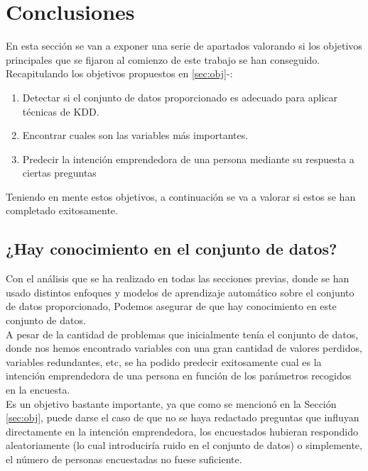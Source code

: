\chapter{Conclusiones}
\label{sec:conclusiones}
En esta sección se van a exponer una serie de apartados valorando si los objetivos principales que se fijaron al comienzo de este trabajo se han conseguido.\\
\linebreak
Recapitulando los objetivos propuestos en \ref{sec:obj}-:
\begin{enumerate}[1.]
	\item Detectar si el conjunto de datos proporcionado es adecuado para aplicar técnicas de KDD.
	\item Encontrar cuales son las variables más importantes.
	\item Predecir la intención emprendedora de una persona mediante su respuesta a ciertas preguntas
\end{enumerate}
Teniendo en mente estos objetivos, a continuación se va a valorar si estos se han completado exitosamente.
\section{¿Hay conocimiento en el conjunto de datos?}
Con el análisis que se ha realizado en todas las secciones previas, donde se han usado distintos enfoques y modelos de aprendizaje automático sobre el conjunto de datos proporcionado, Podemos asegurar de que hay conocimiento en este conjunto de datos.\\
\linebreak
A pesar de la cantidad de problemas que inicialmente tenía el conjunto de datos, donde nos hemos encontrado variables con una gran cantidad de valores perdidos, variables redundantes, etc, se ha podido predecir exitosamente cual es la intención emprendedora de una persona en función de los parámetros recogidos en la encuesta.\\
Es un objetivo bastante importante, ya que como se mencionó en la Sección \ref{sec:obj}, puede darse el caso de que no se haya redactado preguntas que influyan directamente en la intención emprendedora, los encuestados hubieran respondido aleatoriamente (lo cual introduciría ruido en el conjunto de datos) o simplemente, el número de personas encuestadas no fuese suficiente.\\
